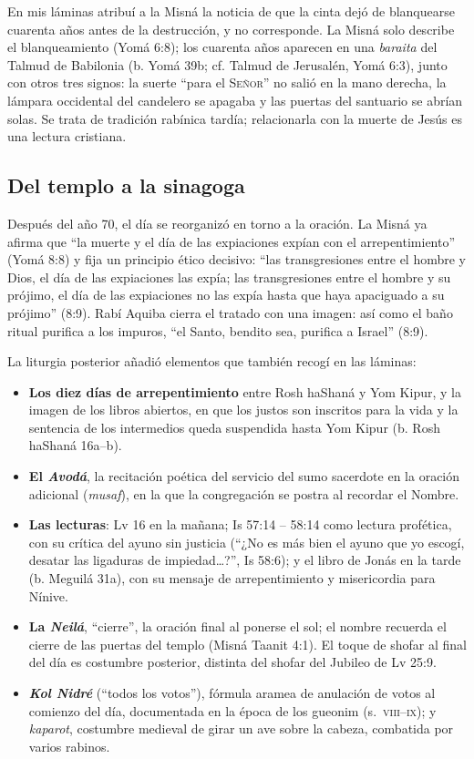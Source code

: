 \documentclass[11pt,letterpaper]{article}
\newcommand{\SENOR}{\textsc{Señor}}
\begin{document}
\begin{nota}
En mis láminas atribuí a la Misná la noticia de que la cinta dejó de blanquearse cuarenta años antes de la destrucción, y no corresponde. La Misná solo describe el blanqueamiento (Yomá 6:8); los cuarenta años aparecen en una \emph{baraita} del Talmud de Babilonia (b. Yomá 39b; cf. Talmud de Jerusalén, Yomá 6:3), junto con otros tres signos: la suerte ``para el \SENOR'' no salió en la mano derecha, la lámpara occidental del candelero se apagaba y las puertas del santuario se abrían solas. Se trata de tradición rabínica tardía; relacionarla con la muerte de Jesús es una lectura cristiana.
\end{nota}

\subsection{Del templo a la sinagoga}
Después del año 70, el día se reorganizó en torno a la oración. La Misná ya afirma que ``la muerte y el día de las expiaciones expían con el arrepentimiento'' (Yomá 8:8) y fija un principio ético decisivo: ``las transgresiones entre el hombre y Dios, el día de las expiaciones las expía; las transgresiones entre el hombre y su prójimo, el día de las expiaciones no las expía hasta que haya apaciguado a su prójimo'' (8:9). Rabí Aquiba cierra el tratado con una imagen: así como el baño ritual purifica a los impuros, ``el Santo, bendito sea, purifica a Israel'' (8:9).

La liturgia posterior añadió elementos que también recogí en las láminas:
\begin{itemize}\setlength{\itemsep}{2pt}
\item \textbf{Los diez días de arrepentimiento} entre Rosh haShaná y Yom Kipur, y la imagen de los libros abiertos, en que los justos son inscritos para la vida y la sentencia de los intermedios queda suspendida hasta Yom Kipur (b. Rosh haShaná 16a--b).
\item \textbf{El \emph{Avodá}}, la recitación poética del servicio del sumo sacerdote en la oración adicional (\emph{musaf}), en la que la congregación se postra al recordar el Nombre.
\item \textbf{Las lecturas}: Lv 16 en la mañana; Is 57:14 -- 58:14 como lectura profética, con su crítica del ayuno sin justicia (``¿No es más bien el ayuno que yo escogí, desatar las ligaduras de impiedad\ldots?'', Is 58:6); y el libro de Jonás en la tarde (b. Meguilá 31a), con su mensaje de arrepentimiento y misericordia para Nínive.
\item \textbf{La \emph{Neilá}}, ``cierre'', la oración final al ponerse el sol; el nombre recuerda el cierre de las puertas del templo (Misná Taanit 4:1). El toque de shofar al final del día es costumbre posterior, distinta del shofar del Jubileo de Lv 25:9.
\item \textbf{\emph{Kol Nidré}} (``todos los votos''), fórmula aramea de anulación de votos al comienzo del día, documentada en la época de los gueonim (s.~\textsc{viii}--\textsc{ix}); y \emph{kaparot}, costumbre medieval de girar un ave sobre la cabeza, combatida por varios rabinos.
\end{itemize}
\end{document}

